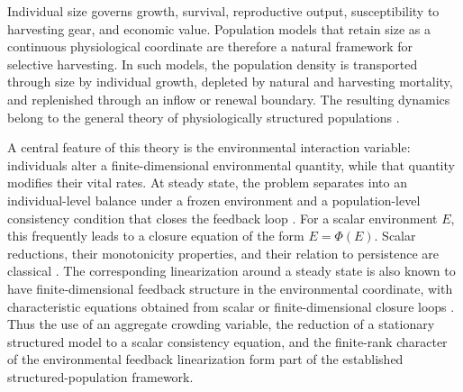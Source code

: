 \documentclass[pdflatex,sn-mathphys-num]{sn-jnl}
\theoremstyle{plain}
\theoremstyle{definition}
\theoremstyle{remark}
\begin{document}
Individual size governs growth, survival, reproductive output, susceptibility to
harvesting gear, and economic value. Population models that retain size as a
continuous physiological coordinate are therefore a natural framework for
selective harvesting. In such models, the population density is transported
through size by individual growth, depleted by natural and harvesting mortality,
and replenished through an inflow or renewal boundary. The resulting dynamics
belong to the general theory of physiologically structured populations
\cite{metz2014dynamics,diekmann2003steady,cai2026optimal,gyllenberg2007mathematical,
diekmann2025age,yu2026rigorous,bouguima2023analysis,chen2022maximum}.

A central feature of this theory is the environmental interaction variable:
individuals alter a finite-dimensional environmental quantity, while that
quantity modifies their vital rates. At steady state, the problem separates into
an individual-level balance under a frozen environment and a population-level
consistency condition that closes the feedback loop
\cite{diekmann2003steady}. For a scalar environment $E$, this frequently
leads to a closure equation of the form $E=\Phi(E)$. Scalar reductions, their
monotonicity properties, and their relation to persistence are classical
\cite{metz2014dynamics,webb1985theory,iannelli2017basic,cushing1994structured,thieme2018mathematics,wang2025analysis,gyllenberg2007mathematical}. The corresponding linearization around a steady state is also
known to have finite-dimensional feedback structure in the environmental
coordinate, with characteristic equations obtained from scalar or
finite-dimensional closure loops
\cite{diekmann1998formulation,diekmann2001formulation,wang2025analysis1,
diekmann2003steady}. Thus the use of an aggregate crowding
variable, the reduction of a stationary structured model to a scalar consistency
equation, and the finite-rank character of the environmental feedback
linearization form part of the established structured-population framework.
\end{document}
